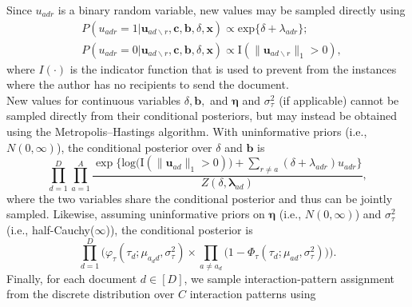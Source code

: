 \documentclass[11pt]{article}
\begin{document}
\iffalse
Since $u_{adr}$ is a binary random variable, new values may be sampled directly using
\begin{equation}
\begin{aligned}
&P(u_{adr}=1| \boldsymbol{u}_{ad\backslash r}, \boldsymbol{c},\boldsymbol{b}, \delta, \boldsymbol{x})
\propto \mbox{exp}\{\delta+\lambda_{adr}\};\\
&P(u_{adr}=0| \boldsymbol{u}_{ad\backslash r}, \boldsymbol{c},\boldsymbol{b}, \delta, \boldsymbol{x})\propto \text{I}(\lVert\boldsymbol{u}_{ad\backslash r}\rVert_1 > 0 ),
\end{aligned}
\label{eqn:latentreceiver}
\end{equation}
where $I(\cdot)$ is the indicator function that is used to prevent from the instances where the author has no recipients to send the document. \\\newline
New values for continuous variables $\delta, \boldsymbol{b},$ and $\boldsymbol{\eta}$ and $\sigma^2_\tau$ (if applicable) cannot be sampled directly from their conditional posteriors, but may instead be obtained using the Metropolis--Hastings algorithm. With uninformative priors (i.e., $N({0},\infty)$), the conditional posterior over $\delta$ and $\boldsymbol{b}$ is
\begin{equation}
\prod_{d=1}^D
\prod_{a=1}^A \frac{\exp\Big\{\mbox{log}\big(\text{I}( \lVert \boldsymbol{u}_{ad}\rVert_1 > 0)\big) + \sum\limits_{r \neq a} (\delta+\lambda_{adr})u_{adr}\Big\}}{Z(\delta,\boldsymbol{\lambda}_{ad})},
\end{equation}
where the two variables share the conditional posterior and thus can be jointly sampled. Likewise, assuming uninformative priors on $\boldsymbol{\eta}$ (i.e., $N({0},\infty)$) and $\sigma_{\tau}^2$ (i.e., half-Cauchy($\infty$)), the conditional posterior is
\begin{equation}
\prod_{d=1}^D\Big(\varphi_{\tau}(\tau_{d}; \mu_{a_d d}, \sigma_\tau^2)\times \prod_{a\neq a_d}\big(1-\Phi_{\tau}(\tau_{d}; \mu_{a d}, \sigma_\tau^2) \big)\Big).
\end{equation}
Finally, for each document $d \in [D]$, we sample interaction-pattern assignment from the discrete distribution over $C$ interaction patterns using 
\end{document}
